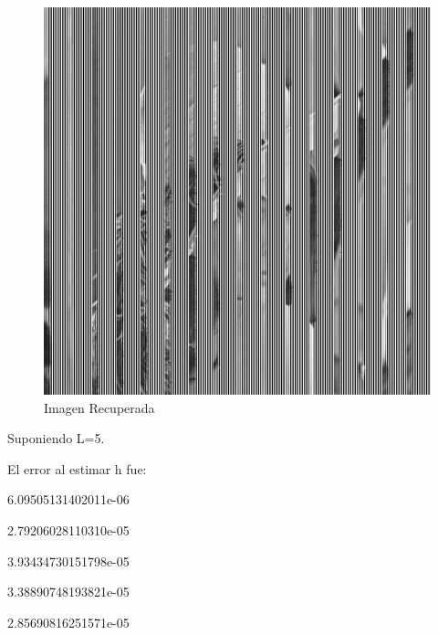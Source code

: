 \documentclass{article}
\begin{document}
\begin{multicols}{2}
\begin{figure}[H]
\centering
\includegraphics[scale=0.2]{../img/corrected_part4b.png}
\caption{Imagen Recuperada}

\end{figure}




\par \large{Suponiendo L=5.}
\par El error al estimar h fue:\\ 
\par   6.09505131402011e-06
\par   2.79206028110310e-05
\par   3.93434730151798e-05
\par   3.38890748193821e-05
\par   2.85690816251571e-05\\


\end{multicols}
\end{document}
